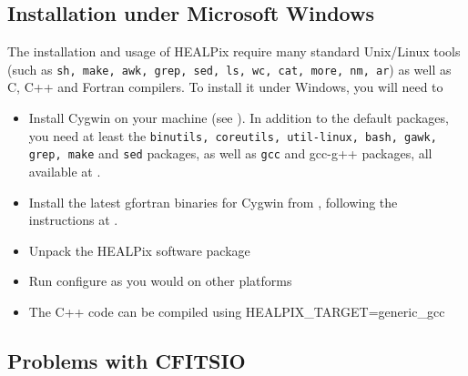 \documentclass[12pt,twoside]{article}
\begin{document}
\subsection{Installation under Microsoft Windows}
\label{sec:windows}
The installation and usage of HEALPix require many standard Unix/Linux tools
(such as {\tt sh, make, awk, grep, sed, ls, wc, cat, more, nm, ar}) as well as C,
C++ and Fortran compilers. To install it under Windows, you will need to
\begin{itemize}
\item Install Cygwin on your machine 
(see ).
In addition to the default packages, you need at least the {\tt binutils,
    coreutils, util-linux, bash, gawk, grep, make} and {\tt sed} packages, as
    well as {\tt gcc} and {gcc-g++} packages, all available at 
.
\item Install the latest gfortran binaries for Cygwin from 
, 
following the instructions at 
.
\item Unpack the HEALPix software package
\item Run configure as you would on other platforms
\item The C++ code can be compiled using HEALPIX\_TARGET=generic\_gcc
\end{itemize}

\subsection{Problems with CFITSIO}
\end{document}
